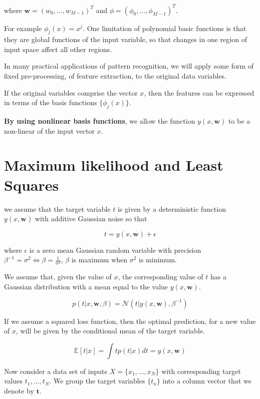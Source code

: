 where $\pmb{w} = (w_0, ..., w_{M - 1})^T$ and $\phi = (\phi_0, ..., \phi _{M - 1})^T$.

For example $\phi_j(x) = x^j$. One limitation of polynomial basic functions is that they are global functions of the input variable, so that changes in one region of input space affect all other regions.

In many practical applications of pattern recognition, we will apply some form of fixed pre-processing, of feature extraction, to the original data variables.

If the original variables comprise the vector $x$, then the features can be expressed in terms of the basis functions $\{\phi_j (x)\}$.

\textbf{By using nonlinear basis functions}, we allow the function $y(x, \pmb{w})$ to be a non-linear of the input vector $x$.

\section{Maximum likelihood and Least Squares}
we assume that the target variable $t$ is given by a deterministic function $y(x, \pmb{w})$ with additive Gaussian noise so that

\begin{equation}
    t = y(x, \pmb{w}) + \epsilon
\end{equation}

where $\epsilon$ is a zero mean Gaussian random variable with precision $\beta^{-1} = \sigma^2 \Leftrightarrow \beta = \frac{1}{\sigma^2}$, $\beta$ is maximum when $\sigma^2$ is minimum.

We assume that, given the value of $x$, the corresponding value of $t$ has a Gaussian distribution with a mean equal to the value $y(x, \pmb{w})$.

\begin{equation}
    p(t|x, \pmb{w}, \beta) = \mathcal{N}(t | y(x, \pmb{w}), \beta^{-1})
\end{equation}

If we assume a squared loss function, then the optimal prediction, for a new value of $x$, will be given by the conditional mean of the target variable.

\begin{equation}
    \mathbb{E}[t|x] = \int tp(t|x)dt = y(x, \pmb{w}) 
\end{equation}

Now consider a data set of inputs $X = \{x_1, ..., x_N\}$ with corresponding target values $t_1, ..., t_N$. We group the target variables $\{t_n\}$ into a column vector that we denote by $\pmb{t}$.

